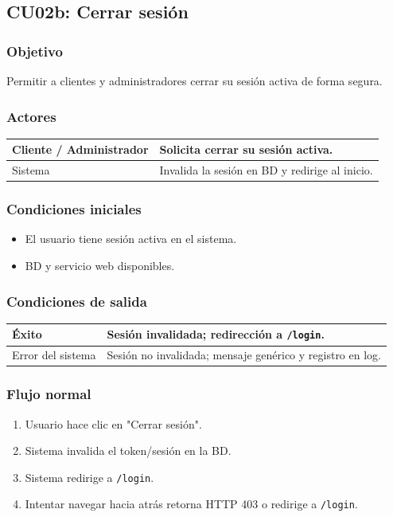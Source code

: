 \documentclass[12pt,a4paper]{article}
\begin{document}

\subsection{CU02b: Cerrar sesión}
\subsubsection*{Objetivo}
Permitir a clientes y administradores cerrar su sesión activa de forma segura.

\subsubsection*{Actores}
\begin{longtable}{|l|p{10cm}|}
    \hline
    Cliente / Administrador & Solicita cerrar su sesión activa.              \\ \hline
    Sistema                 & Invalida la sesión en BD y redirige al inicio. \\ \hline
\end{longtable}

\subsubsection*{Condiciones iniciales}
\begin{itemize}[label=--]
    \item El usuario tiene sesión activa en el sistema.
    \item BD y servicio web disponibles.
\end{itemize}

\subsubsection*{Condiciones de salida}
\begin{longtable}{|l|p{10cm}|}
    \hline
    Éxito             & Sesión invalidada; redirección a \texttt{/login}.                         \\ \hline
    Error del sistema & Sesión no invalidada; mensaje genérico y registro en log.                 \\ \hline
\end{longtable}

\subsubsection*{Flujo normal}
\begin{enumerate}[label=FN-\arabic*]
    \item Usuario hace clic en "Cerrar sesión".
    \item Sistema invalida el token/sesión en la BD.
    \item Sistema redirige a \texttt{/login}.
    \item Intentar navegar hacia atrás retorna HTTP 403 o redirige a \texttt{/login}.
\end{enumerate}
\end{document}
